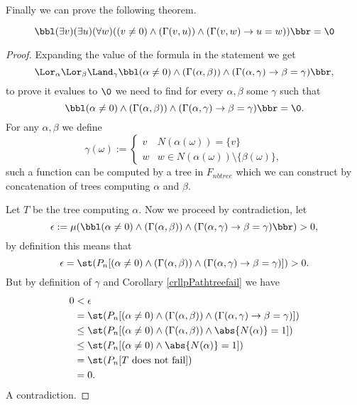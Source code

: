 Finally we can prove the following theorem.

\begin{thrm}
\[\bbl(\exists v)(\exists u)(\forall w)((v\not=0)\land (\Gamma(v,u)) \land(\Gamma(v,w) \to u=w))\bbr=\0\]
\end{thrm}
\begin{proof}
Expanding the value of the formula in the statement we get
\[\Lor_{\alpha}\Lor_{\beta}\Land_{\gamma}\bbl(\alpha\not=0)\land (\Gamma(\alpha,\beta)) \land(\Gamma(\alpha,\gamma) \to \beta=\gamma)\bbr,\]
to prove it evalues to $\0$ we need to find for every $\alpha,\beta$ some $\gamma$ such that
\[\bbl(\alpha\not=0)\land (\Gamma(\alpha,\beta)) \land(\Gamma(\alpha,\gamma) \to \beta=\gamma)\bbr=\0.\]
For any $\alpha,\beta$ we define
\[\gamma(\omega):=\begin{cases}v&N(\alpha(\omega))=\{v\}\\w&w\in N(\alpha(\omega))\setminus\{\beta(\omega)\},\end{cases}\]
such a function can be computed by a tree in $F_{nbtree}$ which we can construct by concatenation of trees computing $\alpha$ and $\beta$.

Let $T$ be the tree computing $\alpha$. Now we proceed by contradiction, let
\[\epsilon:=\mu(\bbl(\alpha\not=0)\land (\Gamma(\alpha,\beta)) \land(\Gamma(\alpha,\gamma) \to \beta=\gamma)\bbr)>0,\]
by definition this means that
\[\epsilon=\st(P_n[(\alpha\not=0)\land (\Gamma(\alpha,\beta)) \land(\Gamma(\alpha,\gamma) \to \beta=\gamma)])>0.\]
But by definition of $\gamma$ and Corollary \ref{crllpPathtreefail} we have
\begin{align*}
0&<\epsilon\\
&=\st(P_n[(\alpha\not=0)\land (\Gamma(\alpha,\beta)) \land(\Gamma(\alpha,\gamma) \to \beta=\gamma)])\\
&\leq\st(P_n[(\alpha\not=0)\land (\Gamma(\alpha,\beta)) \land \abs{N(\alpha)}=1])\\
&\leq\st(P_n[(\alpha\not=0)\land \abs{N(\alpha)}=1])\\
&=\st(P_n[T\text{ does not fail}])\\
&=0.
\end{align*}
A contradiction.
\end{proof}

